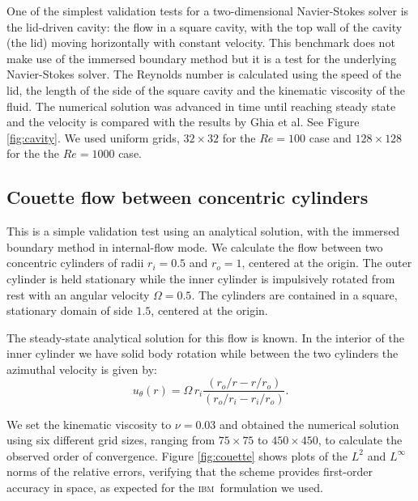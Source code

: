 \documentclass{tufte-handout}
\newcommand{\ibm}{\textsc{ibm}\xspace}
\begin{document}
One of the simplest validation tests for a two-dimensional Navier-Stokes solver is the lid-driven cavity: the flow in a square cavity, with the top wall of the cavity (the lid) moving horizontally with constant velocity. This benchmark does not make use of the immersed boundary method but it is a test for the underlying Navier-Stokes solver. The Reynolds number is calculated using the speed of the lid, the length of the side of the square cavity and the kinematic viscosity of the fluid. The numerical solution was advanced in time until reaching steady state and the velocity is compared with the results by Ghia et al.\cite{GhiaETal1982} See Figure \ref{fig:cavity}. We used uniform grids, $32\times{32}$ for the $Re=100$ case and $128\times{128}$ for the the $Re=1000$ case. 




\subsection{Couette flow between concentric cylinders}

This is a simple validation test using an analytical solution, with the immersed boundary method in internal-flow mode. We calculate the flow between two concentric cylinders of radii $r_i=0.5$ and $r_o=1$, centered at the origin. The outer cylinder is held stationary while the inner cylinder is impulsively rotated from rest with an angular velocity  $\Omega=0.5$. The cylinders are contained in a square, stationary domain of side $1.5$, centered at the origin. 

The steady-state analytical solution for this flow is known. In the interior of the inner cylinder we have solid body rotation while between the two cylinders the azimuthal velocity is given by:
\begin{equation}
u_{\theta}(r)=\Omega\,{r_i}\frac{\left({r_o}/{r}-{r}/{r_o}\right)}{\left({r_o}/{r_i}-{r_i}/{r_o}\right)}.
\end{equation}

We set the kinematic viscosity to $\nu=0.03$ and obtained the numerical solution using six different grid sizes, ranging from $75\times{75}$ to $450\times{450}$, to calculate the observed order of convergence. Figure \ref{fig:couette} shows plots of the $L^2$ and $L^\infty$ norms of the relative errors, verifying that the scheme provides first-order accuracy in space, as expected for the \ibm\ formulation we used.
\end{document}
